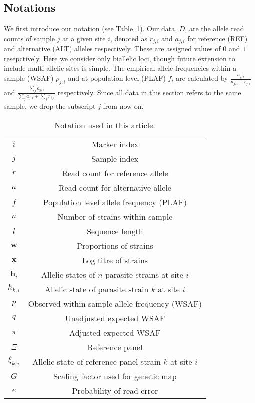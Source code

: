 \documentclass{bioinfo}
\begin{document}
\subsection{Notations}

We first introduce our notation (see Table~\ref{tab:notation}). Our data, $D$, are the allele read counts of sample $j$ at a given site $i$, denoted as $r_{j,i}$ and $a_{j,i}$ for reference (REF) and alternative (ALT) alleles respectively.  These are assigned values of $0$ and $1$ resepctively. Here we consider only biallelic loci, though future extension to include multi-allelic sites is simple.  The empirical allele frequencies within a sample (WSAF) $p_{j,i}$ and at population level (PLAF) $f_i$ are calculated by $ \frac{a_{j,i}}{a_{j,i} + r_{j,i}}$ and $ \frac{\sum_j a_{j,i}}{\sum_j a_{j,i} + \sum_j r_{j,i}}$ respectively. Since all data in this section refers to the same sample, we drop the subscript $j$ from now on.

\begin{table}[htb]\centering
\begin{tabular}{c|c}\hline
$i$              & Marker index\\
$j$              & Sample index \\
$r$              & Read count for reference allele \\
$a$              & Read count for alternative allele \\
$f$              & Population level allele frequency (PLAF) \\
$n$              & Number of strains within sample \\
$l$              & Sequence length \\
$\mathbf{w}$      & Proportions of strains \\
$\mathbf{x}$	& Log titre of strains \\
$\mathbf{h}_{i}$ & Allelic states of $n$ parasite strains at site $i$ \\
$h_{k,i}$   & Allelic state of parasite strain $k$ at site $i$\\
$p$              & Observed within sample allele frequency (WSAF) \\
$q$              & Unadjusted expected WSAF  \\
$\pi$            & Adjusted expected WSAF \\
$\Xi$            & Reference panel\\
$\xi_{k,i}$     & Allelic state of reference panel strain $k$ at site $i$\\
$G$              & Scaling factor used for genetic map\\
$e$              & Probability of read error\\ \hline
\end{tabular}
\caption{Notation used in this article.}\label{tab:notation}
\end{table}
\end{document}
